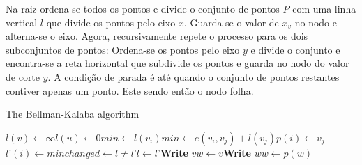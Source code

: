 Na raiz ordena-se todos os pontos e divide o conjunto de pontos \(P\) com uma linha vertical
\(l\) que divide os pontos pelo eixo \(x\). Guarda-se o valor de \(x_v\) no nodo e alterna-se o
eixo.
Agora, recursivamente repete o processo para os dois subconjuntos de pontos:
Ordena-se os pontos pelo eixo \(y\) e divide o conjunto e encontra-se a reta horizontal que
subdivide os pontos e guarda no nodo do valor de corte \(y\).
A condição de parada é até quando o conjunto de pontos restantes contiver apenas um ponto.
Este sendo então o nodo folha.


\begin{algorithm}\caption{The Bellman-Kalaba algorithm}\begin{algorithmic}[1]\State $l(v) \leftarrow \infty$\EndFor\State $l(u) \leftarrow 0$\Repeat{}\State $min \leftarrow l(v_i)$\State $min \leftarrow e(v_i, v_j) + l(v_j)$\State $p(i) \leftarrow v_j$\EndIf\EndFor\State $l’(i) \leftarrow min$\EndFor\State $changed \leftarrow l \not= l’$\State $l \leftarrow l’$\EndProcedure\Statex{}\State \textbf{Write} $v$\Else\State $w \leftarrow v$\State \textbf{Write} $w$\State $w \leftarrow p(w)$\EndWhile\EndIf\EndProcedure\end{algorithmic}\end{algorithm}


